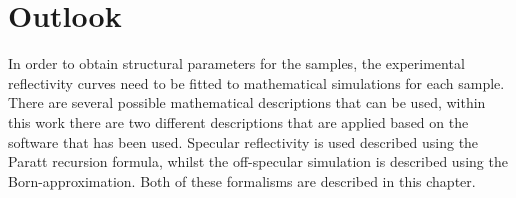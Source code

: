 \chapter{Outlook}
In order to obtain structural parameters for the samples, the experimental reflectivity curves need to be fitted to mathematical simulations for each sample. There are several possible mathematical descriptions that can be used, within this work there are two different descriptions that are applied based on the software that has been used. Specular reflectivity is used described using the Paratt recursion formula, whilst the off-specular simulation is described using the Born-approximation. Both of these formalisms are described in this chapter.